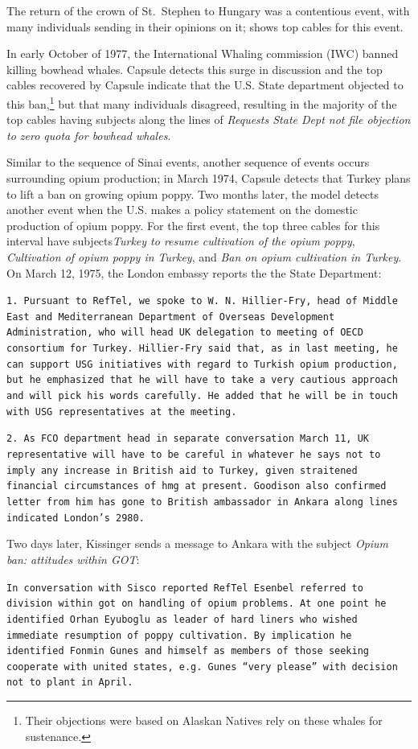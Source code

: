 The return of the crown of St.~Stephen to Hungary was a contentious event, with many individuals sending in their opinions on it;  shows top cables for this event.

In early October of 1977, the International Whaling commission (IWC) banned killing bowhead whales. Capsule detects this surge in discussion and the top cables recovered by Capsule indicate that the U.S. State department objected to this ban,\footnote{Their objections were based on Alaskan Natives rely on these whales for sustenance.} but that many individuals disagreed, resulting in the majority of the top cables having subjects along the lines of \emph{Requests State Dept not file objection to zero quota for bowhead whales}.

Similar to the sequence of Sinai events, another sequence of events occurs surrounding opium production; in March 1974, Capsule detects that Turkey plans to lift a ban on growing opium poppy.  Two months later, the model detects another event when the U.S. makes a policy statement on the domestic production of opium poppy.  For the first event, the top three cables for this interval have subjects\emph{Turkey to resume cultivation of the opium poppy}, \emph{Cultivation of opium poppy in Turkey}, and \emph{Ban on opium cultivation in Turkey}. On March 12, 1975, the London embassy reports the the State Department:
\begin{shaded*}
\tt{1.  Pursuant to RefTel, we spoke to W.~N.~Hillier-Fry, 
head of Middle East and Mediterranean Department
of Overseas Development Administration, who will
head UK delegation to meeting of OECD consortium for
Turkey.  Hillier-Fry said that, as in last meeting,
he can support USG initiatives with regard to Turkish
opium production, but he emphasized that he will have
to take a very cautious approach and will pick his
words carefully.  He added that he will be in touch
with USG representatives at the meeting.}

\tt{2.  As FCO department head
in separate conversation March 11, UK representative
will have to be careful in whatever he says not to
imply any increase in British aid to Turkey, given
straitened financial circumstances of hmg at present.
Goodison also confirmed letter from him has gone to
British ambassador in Ankara along lines indicated
London's 2980.}
\end{shaded*}
\noindent Two days later, Kissinger sends a message to Ankara with the subject \emph{Opium ban: attitudes within GOT}:
\begin{shaded*}
\tt{In conversation with Sisco reported RefTel Esenbel referred
to division within got on handling of opium problems.  At
one point he identified Orhan Eyuboglu as leader of hard
liners who wished immediate resumption of poppy cultivation.  
By implication he identified Fonmin Gunes and
himself as members of those seeking cooperate with united
states, e.g. Gunes ``very please'' with decision not to
plant in April.}
\end{shaded*}
